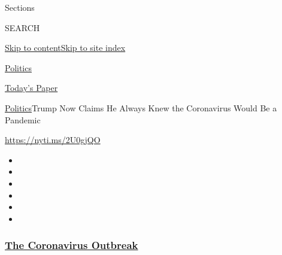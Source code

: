 Sections

SEARCH

\protect\hyperlink{site-content}{Skip to
content}\protect\hyperlink{site-index}{Skip to site index}

\href{https://www.nytimes3xbfgragh.onion/section/politics}{Politics}

\href{https://myaccount.nytimes3xbfgragh.onion/auth/login?response_type=cookie\&client_id=vi}{}

\href{https://www.nytimes3xbfgragh.onion/section/todayspaper}{Today's
Paper}

\href{/section/politics}{Politics}\textbar{}Trump Now Claims He Always
Knew the Coronavirus Would Be a Pandemic

\url{https://nyti.ms/2U0gjQO}

\begin{itemize}
\item
\item
\item
\item
\item
\item
\end{itemize}

\hypertarget{the-coronavirus-outbreak}{%
\subsubsection{\texorpdfstring{\href{https://www.nytimes3xbfgragh.onion/news-event/coronavirus?name=styln-coronavirus-national\&region=TOP_BANNER\&block=storyline_menu_recirc\&action=click\&pgtype=Article\&impression_id=ab6ef310-f52d-11ea-b5ea-07ef05a22056\&variant=undefined}{The
Coronavirus
Outbreak}}{The Coronavirus Outbreak}}\label{the-coronavirus-outbreak}}

